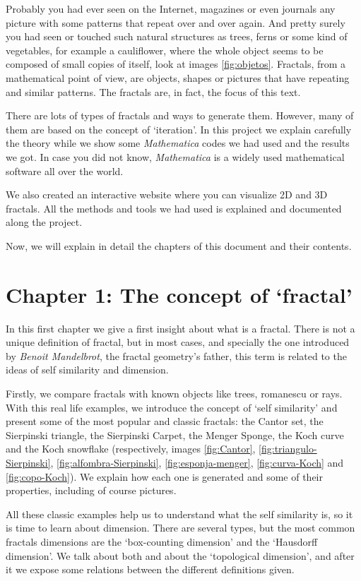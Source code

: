 
Probably you had ever seen on the Internet, magazines or even journals any picture with some patterns that repeat over and over again. And pretty surely you had seen or touched such natural structures as trees, ferns or some kind of vegetables, for example a cauliflower, where the whole object seems to be composed of small copies of itself, look at images \ref{fig:objetos}. Fractals, from a mathematical point of view, are objects, shapes or pictures that have repeating and similar patterns. The fractals are, in fact, the focus of this text.

There are lots of types of fractals and ways to generate them. However, many of them are based on the concept of `iteration'. In this project we explain carefully the theory while we show some \textit{Mathematica} codes we had used and the results we got. In case you did not know, \textit{Mathematica} is a widely used mathematical software all over the world. 

We also created an interactive website where you can visualize 2D and 3D fractals. All the methods and tools we had used is explained and documented along the project.

Now, we will explain in detail the chapters of this document and their contents.

\section*{Chapter 1: The concept of `fractal'}

In this first chapter we give a first insight about what is a fractal. There is not a unique definition of fractal, but in most cases, and specially the one introduced by \textit{Benoit Mandelbrot}, the fractal geometry's father, this term is related to the ideas of self similarity and dimension. 

Firstly, we compare fractals with known objects like trees, romanescu or rays. With this real life examples, we introduce the concept of `self similarity' and present some of the most popular and classic fractals: the Cantor set, the Sierpinski triangle, the Sierpinski Carpet, the Menger Sponge, the Koch curve and the Koch snowflake (respectively, images \ref{fig:Cantor}, \ref{fig:triangulo-Sierpinski}, \ref{fig:alfombra-Sierpinski}, \ref{fig:esponja-menger}, \ref{fig:curva-Koch} and \ref{fig:copo-Koch}). We explain how each one is generated and some of their properties, including of course pictures.

All these classic examples help us to understand what the self similarity is, so it is time to learn about dimension. There are several types, but the most common fractals dimensions are the `box-counting dimension' and the `Hausdorff dimension'. We talk about both and about the `topological dimension', and after it we expose some relations between the different definitions given.

